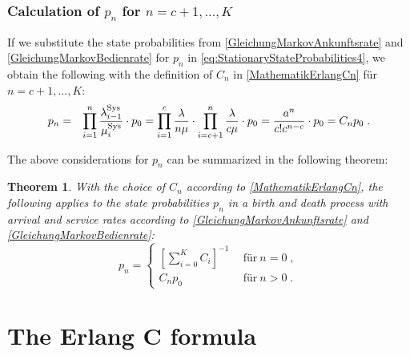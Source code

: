 \documentclass[a4paper,11pt,oneside]{article}
\newtheorem{theorem}{Theorem}
\theoremstyle{definition}
\begin{document}
\subsubsection*{Calculation of $p_n$ for $n=c+1,\ldots,K$}

If we substitute the state probabilities from \eqref{GleichungMarkovAnkunftsrate} and \eqref{GleichungMarkovBedienrate} for $p_n$ in \eqref{eq:StationaryStateProbabilities4}, we obtain the following with the definition of $C_n$ in \eqref{MathematikErlangCn} für $n=c+1,\ldots,K$:
\begin{eqnarray*}
p_n&=&
\prod_{i=1}^n\frac{\lambda_{i-1}^{\rm Sys}}{\mu_i^{\rm Sys}}\cdot p_0=
\prod_{i=1}^c\frac{\lambda}{n\mu}\cdot\prod_{i=c+1}^n\frac{\lambda}{c\mu}\cdot p_0=
\frac{a^n}{c!c^{n-c}}\cdot p_0=
C_np_0\;.
\end{eqnarray*}

The above considerations for $p_n$ can be summarized in the following theorem:

\begin{theorem}
With the choice of $C_n$ according to \eqref{MathematikErlangCn}, the following applies to the state probabilities $p_n$ in a birth and death process with arrival and service rates according to \eqref{GleichungMarkovAnkunftsrate} and \eqref{GleichungMarkovBedienrate}:
\begin{equation}\label{MathematikPn}
p_n=\left\{\begin{array}{ll}
\displaystyle \left[\sum_{i=0}^KC_i\right]^{-1}&~~\textrm{für}~n=0\;,\\
\displaystyle C_n p_0&~~\textrm{für}~n>0\;.
\end{array}\right.
\end{equation}
\end{theorem}



\section{The Erlang C formula}\label{Result}
\end{document}
